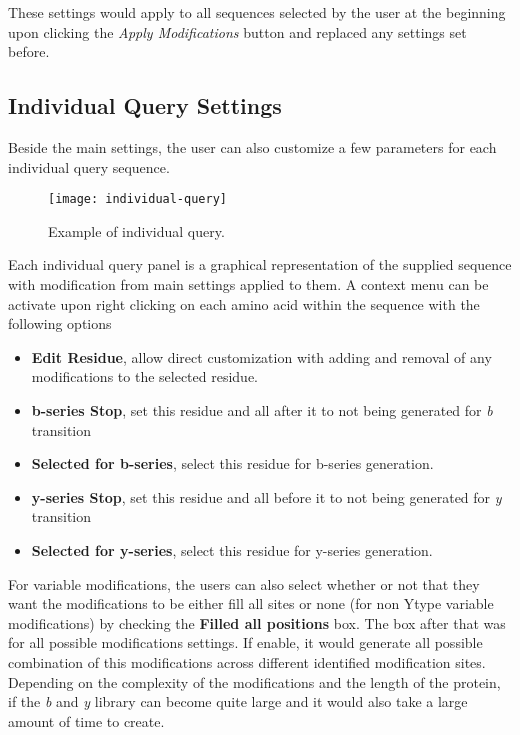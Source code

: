 \documentclass[../manual.tex]{subfiles}
\begin{document}
These settings would apply to all sequences selected by the user at the beginning upon clicking the \emph{Apply Modifications} button and replaced any settings set before.\par

\subsection{Individual Query Settings}
Beside the main settings, the user can also customize a few parameters for each individual query sequence.\par

\begin{figure}[h]
	\centering
	
	\begin{framed}
		\centering
		\begin{adjustbox}{width=1\textwidth}
			\texttt{[image: individual-query]}
		\end{adjustbox}
		\caption{Example of individual query.}\label{fig:individualquery}
	\end{framed}
	
\end{figure}

Each individual query panel is a graphical representation of the supplied sequence with modification from main settings applied to them. A context menu can be activate upon right clicking on each amino acid within the sequence with the following options\par
\begin{itemize}
	\item \textbf{Edit Residue}, allow direct customization with adding and removal of any modifications to the selected residue.
	\item \textbf{b-series Stop}, set this residue and all after it to not being generated for \emph{b} transition
	\item \textbf{Selected for b-series}, select this residue for b-series generation.
	\item \textbf{y-series Stop}, set this residue and all before it to not being generated for \emph{y} transition
	\item \textbf{Selected for y-series}, select this residue for y-series generation.
\end{itemize}

For variable modifications, the users can also select whether or not that they want the modifications to be either fill all sites or none (for non Ytype variable modifications) by checking the \textbf{Filled all positions} box. The box after that was for all possible modifications settings. If enable, it would generate all possible combination of this modifications across different identified modification sites. Depending on the complexity of the modifications and the length of the protein, if the \emph{b} and \emph{y} library can become quite large and it would also take a large amount of time to create.\par
\end{document}
